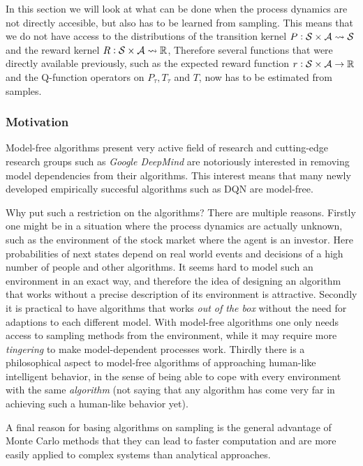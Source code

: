 
In this section we will look at what can be done when the process dynamics
are not directly accesible, but also has to be learned from sampling.
This means that we do not have access to the distributions of the transition
kernel $P : \mathcal{S} \times \mathcal{A} \leadsto \mathcal{S}$ and the reward kernel
$R : \mathcal{S} \times \mathcal{A} \leadsto \mathbb{R}$,
Therefore several functions that were directly available previously,
such as the expected reward function $r : \mathcal{S} \times \mathcal{A}
\to \mathbb{R}$ and the Q-function operators on $P_\tau, T_\tau$ and $T$,
now has to be estimated from samples.

\subsubsection{Motivation}

Model-free algorithms present very active field of research and
cutting-edge research groups such as
\emph{Google DeepMind} are notoriously interested in removing
model dependencies from their algorithms.
This interest means that
many newly developed empirically succesful algorithms such as
DQN are model-free.

Why put such a restriction on the algorithms?
There are multiple reasons.
Firstly one might be in a situation where the process dynamics are actually
unknown, such as the environment of the stock market where the agent is an
investor. Here probabilities of next states depend on real world events and
decisions of a high number of people and other algorithms.
It seems hard to model such an environment in an exact way, 
and therefore the idea of designing an algorithm that works without a
precise description of its environment is attractive.
Secondly it is practical to have algorithms that works
\emph{out of the box}
without the need for adaptions to each different model.
With model-free algorithms one only needs access to sampling methods
from the environment, while it may require more \emph{tingering}
to make model-dependent processes work.
Thirdly there is a philosophical aspect to model-free algorithms
of approaching human-like intelligent behavior,
in the sense of being able to cope with every environment
with the same \emph{algorithm}
(not saying that any algorithm has come very far in achieving
such a human-like behavior yet).

A final reason for basing algorithms on sampling is the general advantage
of Monte Carlo methods that they can lead to faster computation
and are more easily applied to complex
systems than analytical approaches.

